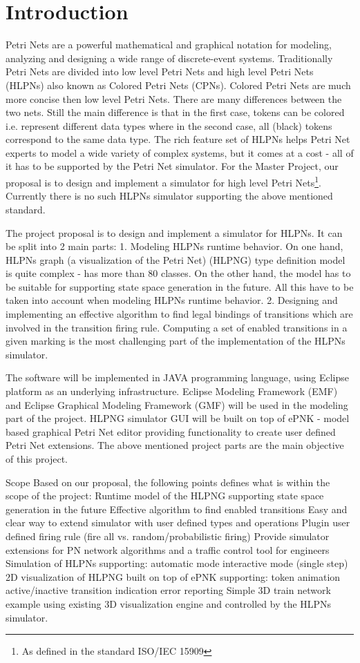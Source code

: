 \chapter{Introduction}

Petri Nets are a powerful mathematical and graphical notation for modeling, analyzing and designing a wide range of discrete-event systems. Traditionally Petri Nets are divided into low level Petri Nets and high level Petri Nets (HLPNs) also known as Colored Petri Nets (CPNs). Colored Petri Nets are much more concise then low level Petri Nets. There are many differences between the two nets. Still the main difference is that in the first case, tokens can be colored i.e. represent different data types where in the second case, all (black) tokens correspond to the same data type. The rich feature set of HLPNs helps Petri Net experts to model a wide variety of complex systems, but it comes at a cost - all of it has to be supported by the Petri Net simulator.
For the Master Project, our proposal is to design and implement a simulator for high level Petri Nets\footnote{As defined in the standard ISO/IEC 15909}. Currently there is no such HLPNs simulator supporting the above mentioned standard.

The project proposal is to design and implement a simulator for HLPNs. It can be split into 2 main parts:
1. Modeling HLPNs runtime behavior. On one hand, HLPNs graph (a visualization of the Petri Net) (HLPNG) type definition model is quite complex - has more than 80 classes. On the other hand, the model has to be suitable for supporting state space generation in the future. All this have to be taken into account when modeling HLPNs runtime behavior.
2. Designing and implementing an effective algorithm to find legal bindings of transitions which are involved in the transition firing rule. Computing a set of enabled transitions in a given marking is the most challenging part of the implementation of the HLPNs simulator.

The software will be implemented in JAVA programming language, using Eclipse platform as an underlying infrastructure. Eclipse Modeling Framework (EMF) and Eclipse Graphical Modeling Framework (GMF) will be used in the modeling part of the project. HLPNG simulator GUI will be built on top of ePNK - model based graphical Petri Net editor providing functionality to create user defined Petri Net extensions.
The above mentioned project parts are the main objective of this project. 

Scope
Based on our proposal, the following points defines what is within the scope of the project:
Runtime model of the HLPNG supporting state space generation in the future
Effective algorithm to find enabled transitions
Easy and clear way to extend simulator with user defined types and operations
Plugin user defined firing rule (fire all vs. random/probabilistic firing)
Provide simulator extensions for PN network algorithms and a traffic control tool for engineers
Simulation of HLPNs supporting:
automatic mode
interactive mode (single step) 
2D visualization of HLPNG built on top of ePNK supporting:
token animation
active/inactive transition indication
error reporting
Simple 3D train network example using existing 3D visualization engine and controlled by the HLPNs simulator.
